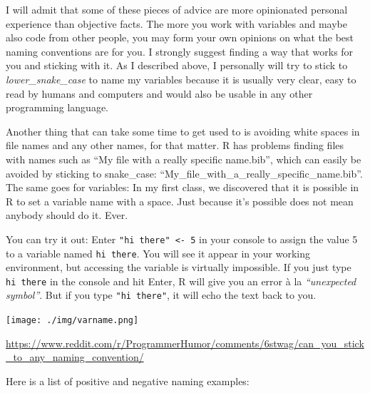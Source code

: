 \documentclass[
]{book}
\begin{document}
I will admit that some of these pieces of advice are more opinionated personal experience than objective facts.
The more you work with variables and maybe also code from other people, you may form your own opinions on what the best naming conventions are for you.
I strongly suggest finding a way that works for you and sticking with it.
As I described above, I personally will try to stick to \emph{lower\_snake\_case} to name my variables because it is usually very clear, easy to read by humans and computers and would also be usable in any other programming language.

Another thing that can take some time to get used to is avoiding white spaces in file names and any other names, for that matter.
R has problems finding files with names such as ``My file with a really specific name.bib'', which can easily be avoided by sticking to snake\_case: ``My\_file\_with\_a\_really\_specific\_name.bib''.
The same goes for variables: In my first class, we discovered that it is possible in R to set a variable name with a space.
Just because it's possible does not mean anybody should do it. Ever.

You can try it out: Enter \texttt{"hi\ there"\ \textless{}-\ 5} in your console to assign the value 5 to a variable named \texttt{hi\ there}.
You will see it appear in your working environment, but accessing the variable is virtually impossible.
If you just type \texttt{hi\ there} in the console and hit Enter, R will give you an error à la \emph{``unexpected symbol''}.
But if you type \texttt{"hi\ there"}, it will echo the text back to you.

\texttt{[image: ./img/varname.png]}

\url{https://www.reddit.com/r/ProgrammerHumor/comments/6stwag/can_you_stick_to_any_naming_convention/}

Here is a list of positive and negative naming examples:
\end{document}
